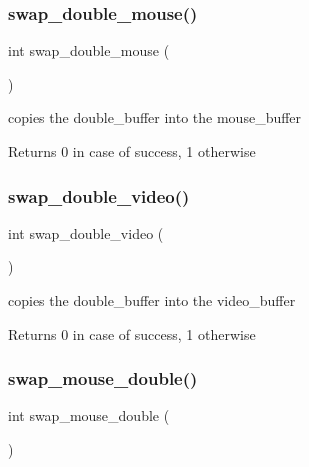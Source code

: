 \subsubsection{\texorpdfstring{swap\+\_\+double\+\_\+mouse()}{swap\_double\_mouse()}}
{\footnotesize\ttfamily int swap\+\_\+double\+\_\+mouse (\begin{DoxyParamCaption}{ }\end{DoxyParamCaption})}



copies the double\+\_\+buffer into the mouse\+\_\+buffer 

\begin{DoxyReturn}{Returns}
0 in case of success, 1 otherwise 
\end{DoxyReturn}
\hypertarget{group__video__gr_gae50eb47e283e71498d323e815411acc3}{}\label{group__video__gr_gae50eb47e283e71498d323e815411acc3} 
\subsubsection{\texorpdfstring{swap\+\_\+double\+\_\+video()}{swap\_double\_video()}}
{\footnotesize\ttfamily int swap\+\_\+double\+\_\+video (\begin{DoxyParamCaption}{ }\end{DoxyParamCaption})}



copies the double\+\_\+buffer into the video\+\_\+buffer 

\begin{DoxyReturn}{Returns}
0 in case of success, 1 otherwise 
\end{DoxyReturn}
\hypertarget{group__video__gr_ga56155e15f2cbeb0c0790c3b22db43a78}{}\label{group__video__gr_ga56155e15f2cbeb0c0790c3b22db43a78} 
\subsubsection{\texorpdfstring{swap\+\_\+mouse\+\_\+double()}{swap\_mouse\_double()}}
{\footnotesize\ttfamily int swap\+\_\+mouse\+\_\+double (\begin{DoxyParamCaption}{ }\end{DoxyParamCaption})}



